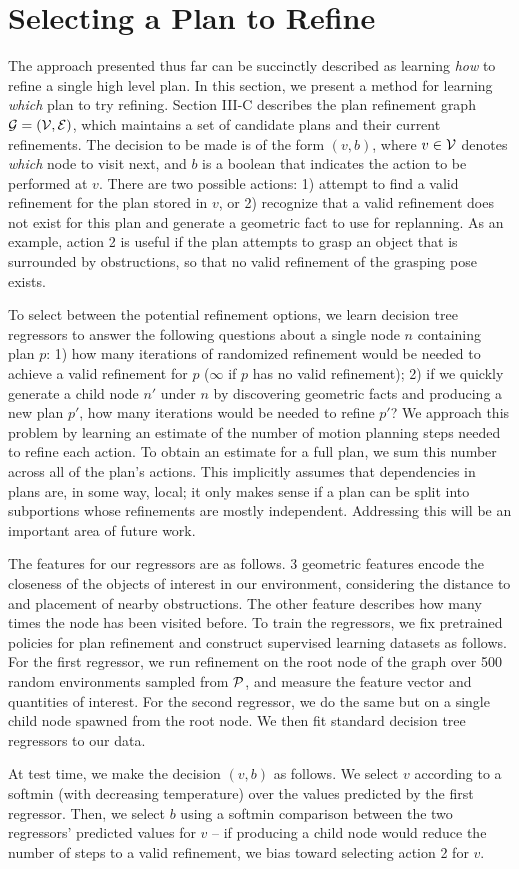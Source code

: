\section{Selecting a Plan to Refine}
The approach presented thus far can be succinctly described as learning \emph{how} to
refine a single high level plan. In this section, we present a method for learning
\emph{which} plan to try refining. Section III-C describes the plan refinement graph $\mathcal{G} = (\mathcal{V}, \mathcal{E})$,
which maintains a set of candidate plans and their current refinements. The decision to be made is of the form $(v, b)$,
where $v \in \mathcal{V}$ denotes \emph{which} node to visit next, and $b$ is a boolean that indicates the action
to be performed at $v$. There are two possible actions: 1) attempt to find a valid refinement
for the plan stored in $v$, or 2) recognize that a valid refinement does not exist for this plan
and generate a geometric fact to use for replanning. As an example, action 2
is useful if the plan attempts to grasp an object that is surrounded by obstructions,
so that no valid refinement of the grasping pose exists.

To select between the potential refinement options, we learn decision tree regressors
to answer the following questions about a single node $n$ containing plan $p$: 1) how many iterations of randomized refinement
would be needed to achieve a valid refinement for $p$ ($\infty$ if $p$ has no valid refinement); 2)
if we quickly generate a child node $n'$ under $n$ by discovering geometric facts and producing a new plan $p'$,
how many iterations would be needed to refine $p'$? We approach this problem by learning an estimate of the
number of motion planning steps needed to refine each action. To obtain an estimate for a full plan, we
sum this number across all of the plan's actions. This implicitly assumes that dependencies in plans are, in some way, local;
it only makes sense if a plan can be split into subportions whose refinements are mostly independent.
Addressing this will be an important area of future work.

The features for our regressors are as follows. 3 geometric features encode the closeness of the objects
of interest in our environment, considering the distance to and placement of nearby obstructions. The other
feature describes how many times the node has been visited before. To train the regressors, we fix pretrained
policies for plan refinement and construct supervised learning datasets as follows.
For the first regressor, we run refinement on the root
node of the graph over 500 random environments sampled from $\mathcal{P}$, and measure the feature vector and quantities of interest.
For the second regressor, we do the same but on a single child node spawned from the root node.
We then fit standard decision tree regressors to our data.

At test time, we make the decision $(v, b)$ as follows. We select $v$ according to a softmin (with decreasing temperature) over the values
predicted by the first regressor. Then, we select $b$ using a softmin comparison between the two regressors'
predicted values for $v$ -- if producing a child node would reduce the number of steps to a valid refinement,
we bias toward selecting action 2 for $v$.